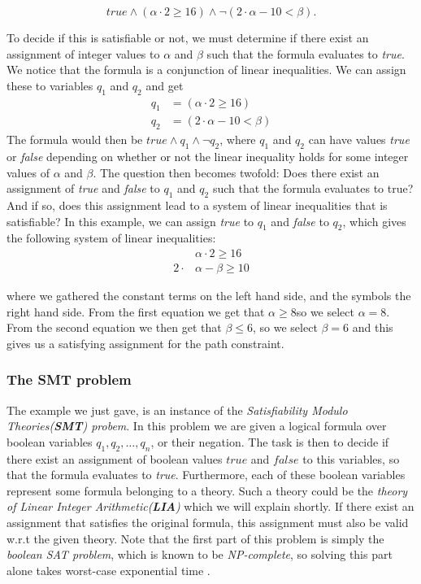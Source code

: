 	\begin{equation}	
		true \land (\alpha \cdot 2 \geq 16) \land \neg (2\cdot \alpha - 10 < \beta).
	\end{equation}
	
	To decide if this is satisfiable or not, we must determine if there exist an assignment of integer values to $\alpha$ and $\beta$ such that the formula evaluates to \emph{true}. We notice that the formula is a conjunction of linear inequalities. We can assign these to variables $q_1$ and $q_2$ and get
	\begin{align}
		q_1 & = (\alpha \cdot 2 \geq 16) \\
		q_2 & = (2\cdot \alpha - 10 < \beta)
	\end{align}
	The formula would then be $true\land q_1 \land \neg q_2$,
	where $q_1$ and $q_2$ can have values \emph{true} or \emph{false} depending on whether or not the linear inequality holds for some integer values of $\alpha$ and $\beta$. The question then becomes twofold: Does there exist an assignment of \emph{true} and \emph{false} to $q_1$ and $q_2$ such that the formula evaluates to true? And if so, does this assignment lead to a system of linear inequalities that is satisfiable?
	In this example, we can assign \emph{true} to $q_1$ and \emph{false} to $q_2$, which gives the following system of linear inequalities:
	\begin{align}
		& \alpha \cdot 2 \geq 16 \\
		2  \cdot & \alpha - \beta \geq 10 
	\end{align}
	
	where we gathered the constant terms on the left hand side, and the symbols the right hand side. From the first equation we get that $\alpha \geq 8$so we select $\alpha = 8$. From the second equation we then get that $\beta \leq 6$, so we select $\beta = 6$ and this gives us a satisfying assignment for the path constraint.	
	\subsubsection{The SMT problem}
	
	The example we just gave, is an instance of the \emph{Satisfiability Modulo Theories(\textbf{SMT}) probem}. In this problem we are given a logical formula over boolean variables $q_1, q_2, \ldots, q_n$, or their negation. The task is then to decide if there exist an assignment of boolean values $true$ and $false$ to this variables, so that the formula evaluates to \emph{true}. Furthermore, each of these boolean variables represent some formula belonging to a theory. Such a theory could be the \emph{theory of Linear Integer Arithmetic(\textbf{LIA})} which we will explain shortly. If there exist an assignment that satisfies the original formula, this assignment must also be valid w.r.t the given theory. Note that the first part of this problem is simply the \emph{boolean SAT problem}, which is known to be \emph{NP-complete}, so solving this part alone takes worst-case exponential time \cite{DeMoura2011}.
	
